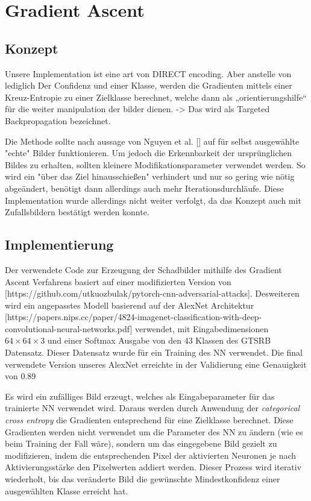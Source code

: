 \chapter{Gradient Ascent}
\label{cha:gascent}
\section{Konzept}


Unsere Implementation ist eine art von DIRECT encoding. Aber anstelle von lediglich Der Confidenz und einer Klasse, werden die Gradienten mittels einer Kreuz-Entropie zu einer Zielklasse berechnet, welche dann als „orientierungshilfe“ für die weiter manipulation der bilder dienen. -> Das wird als Targeted Backpropagation bezeichnet.


Die Methode sollte nach aussage von Nguyen et al. [] auf für selbst ausgewählte "echte" Bilder funktionieren. Um jedoch die Erkennbarkeit der ursprünglichen Bildes zu erhalten, sollten kleinere Modifikationsparameter verwendet werden. So wird ein "über das Ziel hinausschießen" verhindert und nur so gering wie nötig abgeändert, benötigt dann allerdings auch mehr Iterationsdurchläufe.
Diese Implementation wurde allerdings nicht weiter verfolgt, da das Konzept auch mit Zufallsbildern bestätigt werden konnte.

\section{Implementierung}
Der verwendete Code zur Erzeugung der Schadbilder mithilfe des Gradient Ascent Verfahrens basiert auf einer modifizierten Version von [https://github.com/utkuozbulak/pytorch-cnn-adversarial-attacks]. Desweiteren wird ein angepasstes Modell basierend auf der AlexNet Architektur [https://papers.nips.cc/paper/4824-imagenet-classification-with-deep-convolutional-neural-networks.pdf] verwendet, mit Eingabedimensionen $64\times64\times3$ und einer Softmax Ausgabe von den 43 Klassen des GTSRB Datensatz. 
Dieser Datensatz wurde für ein Training des NN verwendet. 
Die final verwendete Version unseres AlexNet erreichte in der Validierung eine Genauigkeit von 0.89


Es wird ein zufälliges Bild erzeugt, welches als Eingabeparameter für das trainierte NN verwendet wird. 
Daraus werden durch Anwendung der \textit{categorical cross entropy} die Gradienten entsprechend für eine Zielklasse berechnet. Diese Gradienten werden nicht verwendet um die Parameter des NN zu ändern (wie es beim Training der Fall wäre), sondern um das eingegebene Bild gezielt zu modifizieren, indem die entsprechenden Pixel der aktivierten Neuronen je nach Aktivierungsstärke den Pixelwerten addiert werden.
Dieser Prozess wird iterativ wiederholt, bis das veränderte Bild die gewünschte Mindestkonfidenz einer ausgewählten Klasse erreicht hat. 

